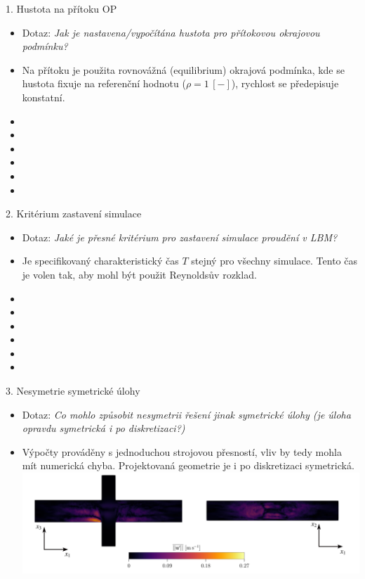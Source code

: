 \documentclass[aspectratio=169,xcolor=dvipsnames]{beamer}
\begin{document}
\begin{frame}{1. Hustota na přítoku OP}
	\begin{itemize}
		\item Dotaz: \textit{Jak je nastavena/vypočítána hustota pro přítokovou okrajovou podmínku?}
		\item Na přítoku je použita rovnovážná (equilibrium) okrajová podmínka, kde se hustota fixuje na referenční hodnotu ($\rho=1 \, [-]$), rychlost se předepisuje konstatní.
		\item[]
		\item[]
		\item[]
		\item[]
		\item[]
		\item[]	
	\end{itemize}
\end{frame}
\begin{frame}{2. Kritérium zastavení simulace}
	\begin{itemize}
		\item Dotaz: \textit{Jaké je přesné kritérium pro zastavení simulace proudění v LBM?}
		\item Je specifikovaný charakteristický čas $T$ stejný pro všechny simulace. Tento čas je volen tak, aby mohl být použit Reynoldsův rozklad.
		\item[]
		\item[]
		\item[]
		\item[]
		\item[]
		\item[]	
	\end{itemize}
\end{frame}
\begin{frame}{3. Nesymetrie symetrické úlohy}
	\begin{itemize}
		\item Dotaz: \textit{Co mohlo způsobit nesymetrii řešení jinak symetrické úlohy (je úloha opravdu symetrická i po diskretizaci?)}
		\item Výpočty prováděny s jednoduchou strojovou přesností, vliv by tedy mohla mít numerická chyba. Projektovaná geometrie je i po diskretizaci symetrická.\\[8pt]
		\includegraphics[width=0.99\linewidth, trim={0 0 0 0}, clip]{Images/dotaz.png}
	\end{itemize}
\end{frame}
\end{document}

